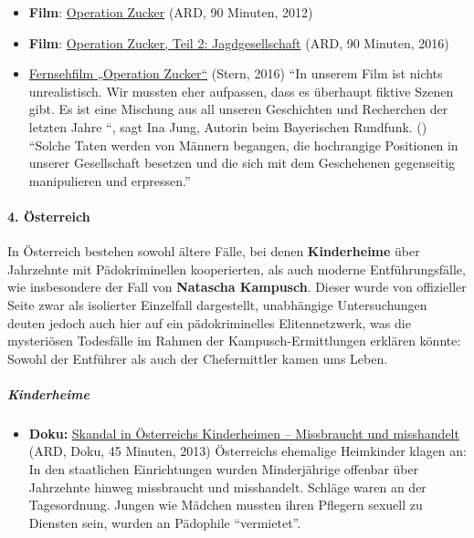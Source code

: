 \begin{itemize}
\tightlist
\item
  \textbf{Film}:
  \href{https://archive.org/details/operation-zucker}{Operation Zucker}
  (ARD, 90 Minuten, 2012)
\item
  \textbf{Film}:
  \href{https://archive.org/details/operation-zucker-jagdgesellschaft-2016}{Operation
  Zucker, Teil 2: Jagdgesellschaft} (ARD, 90 Minuten, 2016)
\item
  \href{https://www.stern.de/familie/leben/operation-zucker-zweiter-teil-bei-kinderprostitution-ist-die-realitaet-schlimmer-als-jeder-film-6659484.html}{Fernsehfilm
  „Operation Zucker``} (Stern, 2016) ``In unserem Film ist nichts
  unrealistisch. Wir mussten eher aufpassen, dass es überhaupt fiktive
  Szenen gibt. Es ist eine Mischung aus all unseren Geschichten und
  Recherchen der letzten Jahre ``, sagt Ina Jung, Autorin beim
  Bayerischen Rundfunk. () ``Solche Taten werden von Männern begangen,
  die hochrangige Positionen in unserer Gesellschaft besetzen und die
  sich mit dem Geschehenen gegenseitig manipulieren und erpressen.''
\end{itemize}

\hypertarget{4-uxf6sterreich}{%
\paragraph{4. Österreich}\label{4-uxf6sterreich}}

In Österreich bestehen sowohl ältere Fälle, bei denen
\textbf{Kinderheime} über Jahrzehnte mit Pädokriminellen kooperierten,
als auch moderne Entführungsfälle, wie insbesondere der Fall von
\textbf{Natascha Kampusch}. Dieser wurde von offizieller Seite zwar als
isolierter Einzelfall dargestellt, unabhängige Untersuchungen deuten
jedoch auch hier auf ein pädokriminelles Elitennetzwerk, was die
mysteriösen Todesfälle im Rahmen der Kampusch-Ermittlungen erklären
könnte: Sowohl der Entführer als auch der Chefermittler kamen ums Leben.

\hypertarget{kinderheime}{%
\subparagraph{\texorpdfstring{\textbf{Kinderheime}}{Kinderheime}}\label{kinderheime}}

\begin{itemize}
\tightlist
\item
  \textbf{Doku:}
  \href{https://www.youtube.com/watch?v=4c6wHYv8X3c}{Skandal in
  Österreichs Kinderheimen -- Missbraucht und misshandelt} (ARD, Doku,
  45 Minuten, 2013) Österreichs ehemalige Heimkinder klagen an: In den
  staatlichen Einrichtungen wurden Minderjährige offenbar über
  Jahrzehnte hinweg missbraucht und misshandelt. Schläge waren an der
  Tagesordnung. Jungen wie Mädchen mussten ihren Pflegern sexuell zu
  Diensten sein, wurden an Pädophile ``vermietet''.
\end{itemize}


